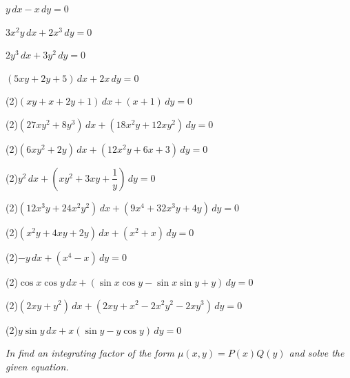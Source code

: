 \begin{exerciselistTwoColumn}
\item\label{exer:2.6.3}$y\,dx-x\,dy=0$ 
\item\label{exer:2.6.4}\vspace*{7.5pt} $3x^2y\,dx+2x^3\,dy=0$
\item\label{exer:2.6.5}$2y^3\,dx+3y^2\,dy=0$
\item\label{exer:2.6.6}$(5xy+2y+5)\,dx+2x\,dy=0$
\item(2)\label{exer:2.6.7}$(xy+x+2y+1)\,dx+(x+1)\,dy=0$
\item(2)\label{exer:2.6.8}$(27xy^2+8y^3)\,dx+(18x^2y+12xy^2)\,dy=0$
\item(2)\label{exer:2.6.9}$(6xy^2+2y)\,dx+(12x^2y+6x+3)\,dy=0$
\item(2)\label{exer:2.6.10}$y^2\,dx+\left(xy^2+3xy+\dfrac{1}{y}\right)\,dy=0$
\item(2)\label{exer:2.6.11}$(12x^3y+24x^2y^2)\,dx+(9x^4+32x^3y+4y)\,dy=0$
\item(2)\label{exer:2.6.12}$(x^2y+4xy+2y)\,dx+(x^2+x)\,dy=0$
\item(2)\label{exer:2.6.13}$-y\,dx+(x^4-x)\,dy=0$
\item(2)\label{exer:2.6.14}$\cos x\cos y\,dx
+(\sin x\cos y-\sin x\sin y+y)\,dy=0$
\item(2)\label{exer:2.6.15}$(2xy+y^2)\,dx+(2xy+x^2-2x^2y^2-2xy^3)\,dy=0$
\item(2)\label{exer:2.6.16}$y\sin y\,dx+x(\sin y-y\cos y)\,dy=0$
\end{exerciselistTwoColumn}
%
\textsl{In  find an
integrating
factor of the form $\mu(x,y)=P(x)Q(y)$ and solve the given equation.}

